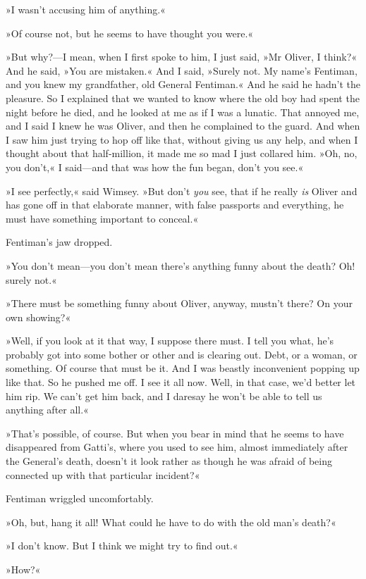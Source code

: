»I wasn't accusing him of anything.«

»Of course not, but he seems to have thought you were.«

»But why?—I mean, when I first spoke to him, I just said, »Mr Oliver, I think?« And he said, »You are mistaken.« And I said, »Surely not. My name's Fentiman, and you knew my grandfather, old General Fentiman.« And he said he hadn't the pleasure. So I explained that we wanted to know where the old boy had spent the night before he died, and he looked at me as if I was a lunatic. That annoyed me, and I said I knew he was Oliver, and then he complained to the guard. And when I saw him just trying to hop off like that, without giving us any help, and when I thought about that half-million, it made me so mad I just collared him. »Oh, no, you don't,« I said—and that was how the fun began, don't you see.«

»I see perfectly,« said Wimsey. »But don't \textit{you} see, that if he really \textit{is} Oliver and has gone off in that elaborate manner, with false passports and everything, he must have something important to conceal.«

Fentiman's jaw dropped.

»You don't mean—you don't mean there's anything funny about the death? Oh! surely not.«

»There must be something funny about Oliver, anyway, mustn't there? On your own showing?«

»Well, if you look at it that way, I suppose there must. I tell you what, he's probably got into some bother or other and is clearing out. Debt, or a woman, or something. Of course that must be it. And I was beastly inconvenient popping up like that. So he pushed me off. I see it all now. Well, in that case, we'd better let him rip. We can't get him back, and I daresay he won't be able to tell us anything after all.«

»That's possible, of course. But when you bear in mind that he seems to have disappeared from Gatti's, where you used to see him, almost immediately after the General's death, doesn't it look rather as though he was afraid of being connected up with that particular incident?«

Fentiman wriggled uncomfortably.

»Oh, but, hang it all! What could he have to do with the old man's death?«

»I don't know. But I think we might try to find out.«

»How?«

